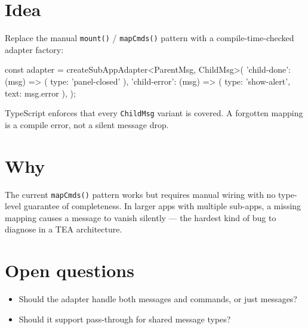 \section{Idea}\label{record-342-idea}

Replace the manual \texttt{m\allowbreak{}o\allowbreak{}u\allowbreak{}n\allowbreak{}t\allowbreak{}(\allowbreak{})} / \texttt{m\allowbreak{}a\allowbreak{}p\allowbreak{}C\allowbreak{}m\allowbreak{}d\allowbreak{}s\allowbreak{}(\allowbreak{})} pattern with a compile-time-checked adapter factory:

\begin{CodeBlock}
const adapter = createSubAppAdapter<ParentMsg, ChildMsg>({
  'child-done': (msg) => ({ type: 'panel-closed' }),
  'child-error': (msg) => ({ type: 'show-alert', text: msg.error }),
});
\end{CodeBlock}

TypeScript enforces that every \texttt{C\allowbreak{}h\allowbreak{}i\allowbreak{}l\allowbreak{}d\allowbreak{}M\allowbreak{}s\allowbreak{}g} variant is covered. A forgotten mapping is a compile error, not a silent message drop.

\section{Why}\label{record-342-why}

The current \texttt{m\allowbreak{}a\allowbreak{}p\allowbreak{}C\allowbreak{}m\allowbreak{}d\allowbreak{}s\allowbreak{}(\allowbreak{})} pattern works but requires manual wiring with no type-level guarantee of completeness. In larger apps with multiple sub-apps, a missing mapping causes a message to vanish silently --- the hardest kind of bug to diagnose in a TEA architecture.

\section{Open questions}\label{record-342-open-questions}

\begin{itemize}
\tightlist
\item
  Should the adapter handle both messages and commands, or just messages?
\item
  Should it support pass-through for shared message types?
\end{itemize}

